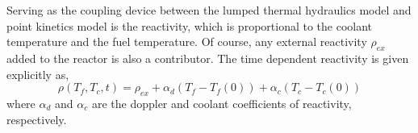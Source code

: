 Serving as the coupling device between the lumped thermal hydraulics model and point kinetics model is the reactivity, which is proportional to the coolant temperature and the fuel temperature. Of course, any external reactivity $\rho_{ex}$ added to the reactor is also a contributor. The time dependent reactivity is given explicitly as,
\begin{equation}
\label{eq:pk_reactivity}
   \rho(T_f,T_c,t) = \rho_{ex} + \alpha_d(T_f - T_f(0))
    + \alpha_c(T_c - T_c(0))
\end{equation}
where $\alpha_d$ and $\alpha_c$ are the doppler and coolant coefficients of reactivity, respectively.  
 
